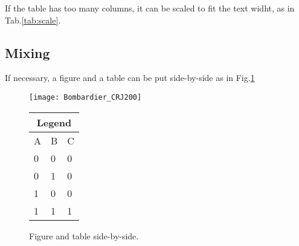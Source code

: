 If the table has too many columns, it can be scaled to fit the text widht, as in Tab.\ref{tab:scale}.
\begin{table}[!htb]
  \renewcommand{\arraystretch}{1.2} %
  \centering
  \caption{Very wide table.}
  \label{tab:scale}%
\end{table}
\fi

\subsection{Mixing}
\label{section:mixing}

If necessary, a figure and a table can be put side-by-side as in Fig.\ref{fig:side_by_side}
\iffalse
\begin{figure}[!htb]
  \begin{minipage}[b]{0.60\linewidth}
    \centering
    \texttt{[image: Bombardier\_CRJ200]}
  \end{minipage}%
  \begin{minipage}[b]{0.30\linewidth}
    \centering
    \begin{tabular}[b]{lll}
      \toprule
        \multicolumn{3}{c}{Legend} \\
      \midrule
        A & B & C \\
        0 & 0 & 0 \\
        0 & 1 & 0 \\
        1 & 0 & 0 \\
        1 & 1 & 1 \\
      \bottomrule
    \end{tabular}
    \vspace{5em}
  \end{minipage}
\caption{Figure and table side-by-side.}
\label{fig:side_by_side}
\end{figure}

